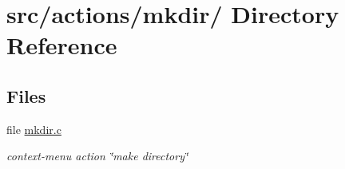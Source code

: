 \hypertarget{dir_000032}{
\section{src/actions/mkdir/ Directory Reference}
\label{dir_000032}
}
\subsection*{Files}
\begin{CompactItemize}
\item 
file \hyperlink{mkdir_8c}{mkdir.c}
\begin{CompactList}\small\item\em context-menu action \char`\"{}make directory\char`\"{} \item\end{CompactList}

\end{CompactItemize}
